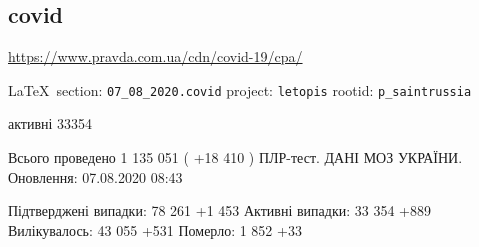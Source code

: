  
 
\subsection{covid}
\label{sec:07_08_2020.covid}
\url{https://www.pravda.com.ua/cdn/covid-19/cpa/}

  
\vspace{0.5cm}
 {\ifDEBUG\small\LaTeX~section: \verb|07_08_2020.covid| project: \verb|letopis| rootid: \verb|p_saintrussia| \fi}
\vspace{0.5cm}

активні 33354

Всього проведено 1 135 051 ( +18 410 ) ПЛР-тест.
ДАНІ МОЗ УКРАЇНИ. Оновлення: 07.08.2020 08:43

Підтверджені випадки: 78 261 +1 453 Активні випадки: 33 354 +889 Вилікувалось:
43 055 +531 Померло: 1 852 +33
  
